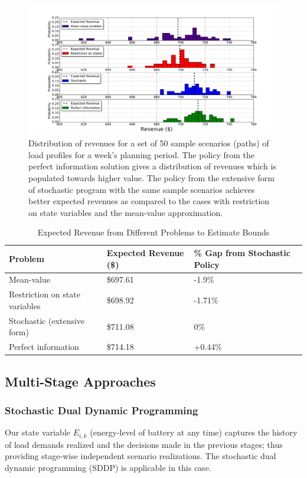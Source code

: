 \documentclass[11pt,twoside]{article}
\begin{document}
\begin{figure}[h!]
\begin{center}
\includegraphics[scale=0.42]
{Figures/Plots/fullproblem_stoch/histogram_costs.pdf} \caption{Distribution of revenues for a set of 50 sample scenarios (paths) of load profiles for a week's planning period. The policy from the perfect information solution gives a distribution of revenues which is populated towards higher value. The policy from the extensive form of stochastic program with the same sample scenarios achieves better expected revenues as compared to the cases with restriction on state variables and the mean-value approximation.
}\label{fig:histogram}\end{center}
\end{figure}
\FloatBarrier
\begin{table}[!ht]\centering
\caption{Expected Revenue from Different Problems to Estimate Bounds}
\begin{tabular}{|C{5cm}|C{3.5cm}|C{3.5cm}|} 
\hline 
Problem  & Expected Revenue (\$) & \% Gap from Stochastic Policy \\
\hline 
Mean-value & \$697.61 & -1.9\%\\ 
\hline 
Restriction on state variables & \$698.92 & -1.71\% \\ 
\hline 
Stochastic (extensive form) & \$711.08 & 0\% \\ 
\hline 
Perfect information & \$714.18 & +0.44\% \\ 
\hline 
\end{tabular} \label{tab:bounds} 
\end{table}

\subsection{Multi-Stage Approaches}\label{sec:multistage}
\subsubsection{Stochastic Dual Dynamic Programming} \label{subsec:dual}
Our state variable $E_{i,k}$ (energy-level of battery at any time) captures the history of load demands realized and the decisions made in the previous stages; thus providing stage-wise independent scenario realizations. The stochastic dual dynamic programming (SDDP) is applicable in this case. 
\end{document}

